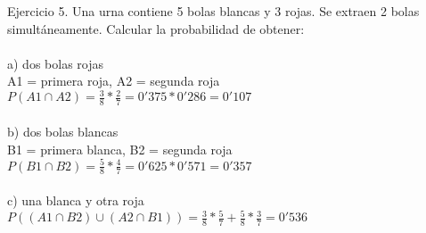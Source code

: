 \documentclass{article}
\begin{document}
Ejercicio 5. Una urna contiene 5 bolas blancas y 3 rojas. Se extraen 2 bolas simultáneamente. Calcular la probabilidad de obtener: \\ \\
a) dos bolas rojas \\
A1 = primera roja, A2 = segunda roja \\
$P(A1 \cap A2) = \frac{3}{8} * \frac{2}{7} = 0'375*0'286 = 0'107$ \\ \\
b) dos bolas blancas \\ 
B1 = primera blanca, B2 = segunda roja \\
$P(B1 \cap B2) =  \frac{5}{8} * \frac{4}{7} = 0'625 * 0'571 = 0'357$ \\ \\
c) una blanca y otra roja \\
$P((A1 \cap B2)\cup (A2 \cap B1)) = \frac{3}{8}*\frac{5}{7} + \frac{5}{8}*\frac{3}{7} = 0'536$ \\
\end{document}
